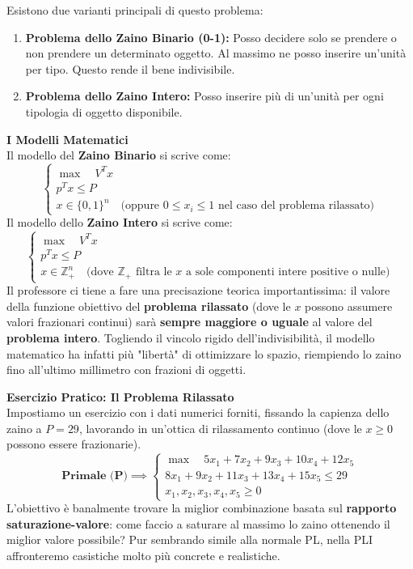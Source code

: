 \documentclass[12pt, a4paper]{article}
\newcommand{\separatore}{\noindent{\color{titlecolor!50}\rule{\textwidth}{0.6pt}}}
\begin{document}
	Esistono due varianti principali di questo problema:
	\begin{enumerate}
		\item \textbf{Problema dello Zaino Binario (0-1):} Posso decidere solo se prendere o non prendere un determinato oggetto. Al massimo ne posso inserire un'unità per tipo. Questo rende il bene indivisibile.
		\item \textbf{Problema dello Zaino Intero:} Posso inserire più di un'unità per ogni tipologia di oggetto disponibile.
	\end{enumerate}
	
	\vspace{0.4cm}
	\textbf{I Modelli Matematici}\\
	Il modello del \textbf{Zaino Binario} si scrive come:
	\[
	\begin{cases}
		\max \quad V^T x \\
		p^T x \leq P \\
		x \in \{0, 1\}^n \quad \text{(oppure } 0 \leq x_i \leq 1 \text{ nel caso del problema rilassato)}
	\end{cases}
	\]
	Il modello dello \textbf{Zaino Intero} si scrive come:
	\[
	\begin{cases}
		\max \quad V^T x \\
		p^T x \leq P \\
		x \in \mathbb{Z}_+^n \quad \text{(dove } \mathbb{Z}_+ \text{ filtra le } x \text{ a sole componenti intere positive o nulle)}
	\end{cases}
	\]
	Il professore ci tiene a fare una precisazione teorica importantissima: il valore della funzione obiettivo del \textbf{problema rilassato} (dove le $x$ possono assumere valori frazionari continui) sarà \textbf{sempre maggiore o uguale} al valore del \textbf{problema intero}. Togliendo il vincolo rigido dell'indivisibilità, il modello matematico ha infatti più "libertà" di ottimizzare lo spazio, riempiendo lo zaino fino all'ultimo millimetro con frazioni di oggetti.
	
	\vspace{0.6cm}
	\separatore
	\vspace{0.4cm}
	
	\textbf{Esercizio Pratico: Il Problema Rilassato}\\
	Impostiamo un esercizio con i dati numerici forniti, fissando la capienza dello zaino a $P = 29$, lavorando in un'ottica di rilassamento continuo (dove le $x \geq 0$ possono essere frazionarie).
	\[
	\textbf{Primale (P)} \implies
	\begin{cases}
		\max \quad 5x_1 + 7x_2 + 9x_3 + 10x_4 + 12x_5 \\[6pt]
		8x_1 + 9x_2 + 11x_3 + 13x_4 + 15x_5 \leq 29 \\[6pt]
		x_1, x_2, x_3, x_4, x_5 \geq 0
	\end{cases}
	\]
	L'obiettivo è banalmente trovare la miglior combinazione basata sul \textbf{rapporto saturazione-valore}: come faccio a saturare al massimo lo zaino ottenendo il miglior valore possibile? Pur sembrando simile alla normale PL, nella PLI affronteremo casistiche molto più concrete e realistiche.
	
\end{document}
